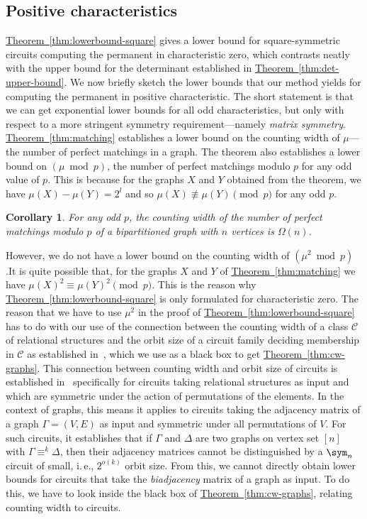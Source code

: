\documentclass[11pt]{article}
\newcommand{\expref}[2]{\texorpdfstring{\hyperref[#2]{#1~\ref{#2}}}{#1~\ref{#2}}}
\newtheorem{corollary}[theorem]{Corollary}
\newcommand{\ie}{i.\,e.}
\begin{document}
\subsection{Positive characteristics}\label{sec:positive-char}
\expref{Theorem}{thm:lowerbound-square} gives a lower bound for
square-symmetric %
%
circuits computing the permanent in characteristic zero, which contrasts neatly with the upper bound for the determinant established in \expref{Theorem}{thm:det-upper-bound}.  We now briefly sketch the lower bounds that our method yields for computing the permanent in positive characteristic.  The short statement is that we can get exponential lower bounds for all odd characteristics, but only with respect to a more stringent symmetry requirement---namely \emph{matrix symmetry}.
\expref{Theorem}{thm:matching} establishes a lower bound on the counting width of $\mu$---the number of perfect matchings in a graph.  The theorem also establishes a lower bound on $(\mu \bmod p)$, the number of perfect matchings modulo $p$ for any odd value of $p$.  This is because for the graphs $X$ and $Y$ obtained from the theorem, we have $\mu(X) - \mu(Y) = 2^l$ and so $\mu(X) \not\equiv \mu(Y) \pmod p$ for any odd $p$.
\begin{corollary}\label{cor:modp-width}
  For any odd $p$, the counting width of the number of perfect matchings modulo $p$ of a bipartitioned graph with $n$ vertices is $\Omega(n)$.
\end{corollary}
However, we do not have a lower bound on the counting width of $(\mu^2 \bmod p)$.It is quite possible that, for the graphs $X$ and $Y$ of \expref{Theorem}{thm:matching} we have $\mu(X)^2 \equiv \mu(Y)^2 \pmod p$.  This is the reason why \expref{Theorem}{thm:lowerbound-square} is only formulated for characteristic zero.
The reason that we have to use $\mu^2$ in the proof of
\expref{Theorem}{thm:lowerbound-square} has to do with our use of the
connection between the counting width of a class $\mathcal{C}$ of
relational structures and the orbit size of a circuit family deciding
membership in $\mathcal{C}$ as established in~\cite{AndersonD17},
which we use as a black box to get \expref{Theorem}{thm:cw-graphs}.  This
connection between counting width and orbit size of circuits is
established in~\cite{AndersonD17} specifically for circuits taking
relational structures as input and which are symmetric under the
action of permutations of the elements.  In the context of graphs, this means it applies to circuits taking the adjacency matrix of a graph $\Gamma = (V,E)$ as input and symmetric under all permutations of $V$.  For such circuits, it establishes that if $\Gamma$ and $\Delta$ are two graphs on vertex set $[n]$ with $\Gamma \equiv^k \Delta$, then their adjacency matrices cannot be distinguished by a $\sym_n$ circuit of small, \ie, $2^{o(k)}$ orbit size.  From this, we cannot directly obtain lower bounds for circuits that take the \emph{biadjacency} matrix of a graph as input.  To do this, we have to look inside the black box of \expref{Theorem}{thm:cw-graphs}, relating counting width to circuits.
\end{document}
